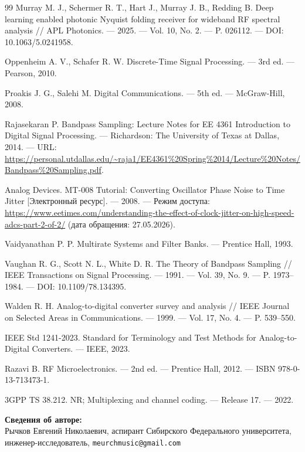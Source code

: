 \documentclass[a4paper,12pt]{article}
\numberwithin{equation}{section}
\begin{document}
\begin{thebibliography}{99}
Murray M. J., Schermer R. T., Hart J., Murray J. B., Redding B. Deep learning enabled photonic Nyquist folding receiver for wideband RF spectral analysis // APL Photonics. --- 2025. --- Vol. 10, No. 2. --- P. 026112. --- DOI: 10.1063/5.0241958.

Oppenheim A. V., Schafer R. W. Discrete-Time Signal Processing. --- 3rd ed. --- Pearson, 2010.

Proakis J. G., Salehi M. Digital Communications. --- 5th ed. --- McGraw-Hill, 2008.

Rajasekaran P. Bandpass Sampling: Lecture Notes for EE 4361 Introduction to Digital Signal Processing. --- Richardson: The University of Texas at Dallas, 2014. --- URL: \url{https://personal.utdallas.edu/~raja1/EE4361\%20Spring\%2014/Lecture\%20Notes/Bandpass\%20Sampling.pdf}.

Analog Devices. MT-008 Tutorial: Converting Oscillator Phase Noise to Time Jitter [Электронный ресурс]. --- 2008. --- Режим доступа: \url{https://www.eetimes.com/understanding-the-effect-of-clock-jitter-on-high-speed-adcs-part-2-of-2/} (дата обращения: 27.05.2026).

Vaidyanathan P. P. Multirate Systems and Filter Banks. --- Prentice Hall, 1993.

Vaughan R. G., Scott N. L., White D. R. The Theory of Bandpass Sampling // IEEE Transactions on Signal Processing. --- 1991. --- Vol. 39, No. 9. --- P. 1973--1984. --- DOI: 10.1109/78.134395.

Walden R. H. Analog-to-digital converter survey and analysis // IEEE Journal on Selected Areas in Communications. --- 1999. --- Vol. 17, No. 4. --- P. 539--550.

IEEE Std 1241-2023. Standard for Terminology and Test Methods for Analog-to-Digital Converters. --- IEEE, 2023.

Razavi B. RF Microelectronics. --- 2nd ed. --- Prentice Hall, 2012. --- ISBN 978-0-13-713473-1.

3GPP TS 38.212. NR; Multiplexing and channel coding. --- Release 17. --- 2022.

\end{thebibliography}

\vspace{0.5cm}
\par\noindent\textbf{Сведения об авторе:}\\
Рычков Евгений Николаевич, аспирант Сибирского Федерального университета, инженер-исследователь, \texttt{meurchmusic@gmail.com}
\end{document}
